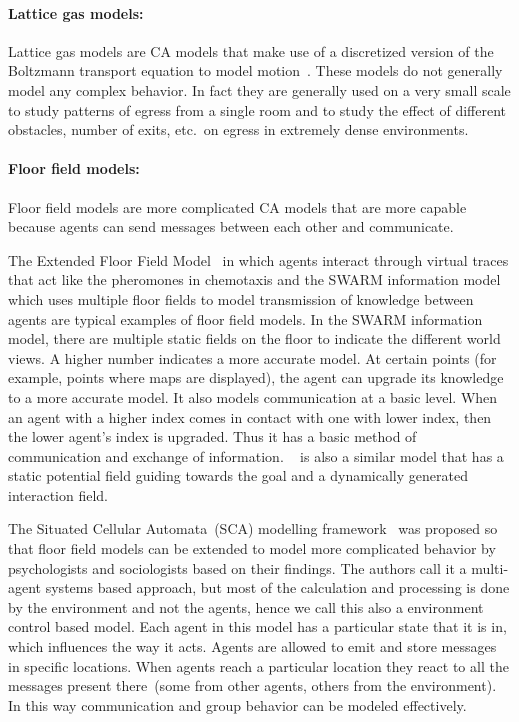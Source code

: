 \paragraph{Lattice gas models:}

Lattice gas models are CA models that make use of a discretized version of the Boltzmann transport equation to model motion~\cite{Marconi:2002ue,Marconi2002,Nagai:2004kl}. These models do not generally model any complex behavior. In fact they are generally used on a very small scale to study patterns of egress from a single room and to study the effect of different obstacles, number of exits, etc.\ on egress in extremely dense environments.

\paragraph{Floor field models:}

Floor field models are more complicated CA models that are more capable because agents can send messages between each other and communicate.

The Extended Floor Field Model~\cite{nishinari2004extended} in which agents interact through virtual traces that act like the pheromones in chemotaxis and the SWARM information model~\cite{Henein:2006jq} which uses multiple floor fields to model transmission of knowledge between agents are typical examples of floor field models. In the SWARM information model, there are multiple static fields on the floor to indicate the different world views. A higher number indicates a more accurate model. At certain points (for example, points where maps are displayed), the agent can upgrade its knowledge to a more accurate model. It also models communication at a basic level. When an agent with a higher index comes in contact with one with lower index, then the lower agent's index is upgraded. Thus it has a basic method of communication and exchange of information. ~\cite{Qi:2011kv} is also a similar model that has a static potential field guiding towards the goal and a dynamically generated interaction field.

The Situated Cellular Automata~(SCA) modelling framework~\cite{Bandini:2007fa} was proposed so that floor field models can be extended to model more complicated behavior by psychologists and sociologists based on their findings. The authors call it a multi-agent systems based approach, but most of the calculation and processing is done by the environment and not the agents, hence we call this also a environment control based model. Each agent in this model has a particular state that it is in, which influences the way it acts. Agents are allowed to emit and store messages in specific locations. When agents reach a particular location they react to all the messages present there~(some from other agents, others from the environment). In this way communication and group behavior can be modeled effectively.

